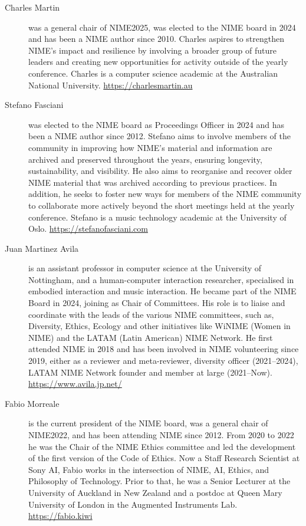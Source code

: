 \documentclass[acmsmall]{nimeart}
\begin{document}
\begin{description}
    
\item[Charles Martin] was a general chair of NIME2025, was elected to the NIME board in 2024 and has been a NIME author since 2010.
Charles aspires to strengthen NIME's impact and resilience by involving a broader group of future leaders and creating new opportunities for activity outside of the yearly conference.
Charles is a computer science academic at the Australian National University. \url{https://charlesmartin.au}

\item[Stefano Fasciani] was elected to the NIME board as Proceedings Officer in 2024 and has been a NIME author since 2012.
Stefano aims to involve members of the community in improving how NIME’s material and information are archived and preserved throughout the years, ensuring longevity, sustainability, and visibility. He also aims to reorganise and recover older NIME material that was archived according to previous practices. In addition, he seeks to foster new ways for members of the NIME community to collaborate more actively beyond the short meetings held at the yearly conference.
Stefano is a music technology academic at the University of Oslo. \url{https://stefanofasciani.com}

\item[Juan Martinez Avila] is an assistant professor in computer science at the University of Nottingham, and a human-computer interaction researcher, specialised in embodied interaction and music interaction. He became part of the NIME Board in 2024, joining as Chair of Committees. His role is to liaise and coordinate with the leads of the various NIME committees, such as, Diversity, Ethics, Ecology and other initiatives like WiNIME (Women in NIME) and the LATAM (Latin American) NIME Network. He first attended NIME in 2018 and has been involved in NIME volunteering since 2019, either as a reviewer and meta-reviewer, diversity officer (2021--2024), LATAM NIME Network founder and member at large (2021--Now).
\url{https://www.avila.jp.net/}

\item[Fabio Morreale] is the current president of the NIME board, was a general chair of NIME2022, and has been attending NIME since 2012. From 2020 to 2022 he was the Chair of the NIME Ethics committee and led the development of the first version of the Code of Ethics. Now a Staff Research Scientist at Sony AI, Fabio works in the intersection of NIME, AI, Ethics, and Philosophy of Technology. Prior to that, he was a Senior Lecturer at the University of Auckland in New Zealand and a postdoc at Queen Mary University of London in the Augmented Instruments Lab.  \url{https://fabio.kiwi}


\end{description}
\end{document}
